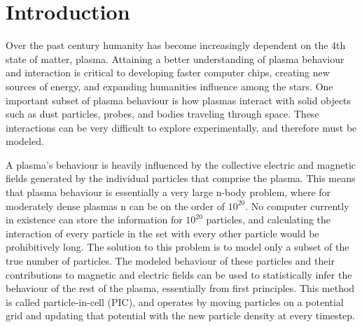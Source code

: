 
\chapter{Introduction}
\label{ch:introduction}
	Over the past century humanity has become increasingly dependent on the 4th state of matter, plasma. Attaining a better understanding of plasma behaviour and interaction is critical to developing faster computer chips, creating new sources of energy, and expanding humanities influence among the stars. One important subset of plasma behaviour is how plasmas interact with solid objects such as dust particles, probes, and bodies traveling through space. These interactions can be very difficult to explore experimentally, and therefore must be modeled. 
	
A plasma's behaviour is heavily influenced by the collective electric and magnetic fields generated by the individual particles that comprise the plasma. This means that plasma behaviour is essentially a very large n-body problem, where for moderately dense plasmas n can be on the order of $10^{20}$. No computer currently in existence can store the information for $10^{20}$ particles, and calculating the interaction of every particle in the set with every other particle would be prohibitively long. The solution to this problem is to model only a subset of the true number of particles. The modeled behaviour of these particles and their contributions to magnetic and electric fields can be used to statistically infer the behaviour of the rest of the plasma, essentially from first principles. This method is called particle-in-cell (PIC), and operates by moving particles on a potential grid and updating that potential with the new particle density at every timestep. 

